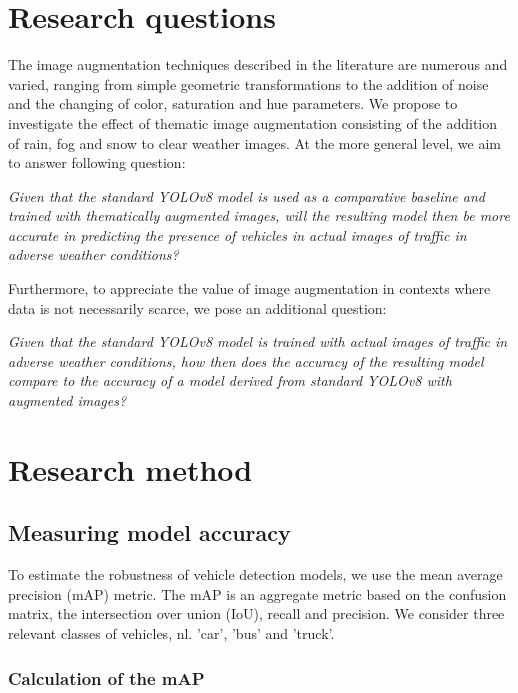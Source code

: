 \documentclass[]{article}
\begin{document}
	
	
	


	



\section{Research questions}

	The image augmentation techniques described in the literature are numerous and varied, ranging from simple geometric transformations to the addition of noise and the changing of color, saturation and hue parameters. We propose to investigate the effect of thematic image augmentation consisting of the addition of rain, fog and snow to clear weather images. At the more general level, we aim to answer following question:
	
	\textit{Given that the standard YOLO{\small v8} model is used as a comparative baseline and trained with thematically augmented images, will the resulting model then be more accurate in predicting the presence of vehicles in actual images of traffic in adverse weather conditions?}
	
	Furthermore, to appreciate the value of image augmentation in contexts where data is not necessarily scarce, we pose an additional question:
	
	\textit{Given that the standard YOLO{\small v8} model is trained with actual images of traffic in adverse weather conditions, how then does the accuracy of the resulting model compare to the accuracy of a model derived from standard YOLO{\small v8} with augmented images?}
	

\section{Research method}
\subsection{Measuring model accuracy}

	To estimate the robustness of vehicle detection models, we use the mean average precision (mAP) metric. The mAP is an aggregate metric based on the confusion matrix, the intersection over union (IoU), recall and precision. We consider three relevant classes of vehicles, nl. 'car', 'bus' and 'truck'.

\subsubsection{Calculation of the mAP}
\end{document}
